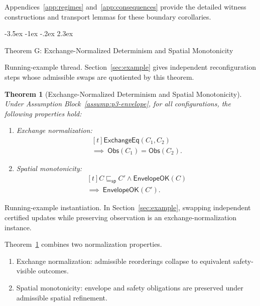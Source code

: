 \documentclass[a4paper,10pt,twocolumn,english]{article}
\makeatletter
\renewcommand{\section}{\@startsection{section}{1}{\z@}%
  {-3.5ex \@plus -1ex \@minus -.2ex}%
  {2.3ex}%
  {\raggedright\normalfont\large\bfseries}}
\numberwithin{equation}{section}
\theoremstyle{paperdef}
\theoremstyle{paperplain}
\newtheorem{theorem}[definition]{Theorem}
\theoremstyle{paperdef}
\theoremstyle{paperremark}
\theoremstyle{paperdef}
\newcommand{\EnvelopeOK}{\ensuremath{\mathsf{EnvelopeOK}}}
\newcommand{\ExchangeEq}{\ensuremath{\mathsf{ExchangeEq}}}
\newcommand{\Obs}{\ensuremath{\mathsf{Obs}}}
\makeatother
\begin{document}
Appendices~\ref{app:regimes} and~\ref{app:consequences} provide the detailed witness constructions and transport lemmas for these boundary corollaries.

\section{Theorem G: Exchange-Normalized Determinism and Spatial Monotonicity}
\label{sec:theorem-g}

Running-example thread. Section~\ref{sec:example} gives independent
reconfiguration steps whose admissible swaps are quotiented by this theorem.

\begin{theorem}[Exchange-Normalized Determinism and Spatial Monotonicity]
	\label{thm:normalization}
	Under Assumption Block~\ref{assump:p3-envelope}, for all configurations, the following properties hold:
	\begin{enumerate}
		\item Exchange normalization:
		      \begin{equation}
			      \begin{aligned}[t]
				      \ExchangeEq(C_1,C_2)
				      \\
				      \implies\ \Obs(C_1) = \Obs(C_2).
			      \end{aligned}
		      \end{equation}
		\item Spatial monotonicity:
		      \begin{equation}
			      \begin{aligned}[t]
				      C \sqsubseteq_{\mathsf{sp}} C' \land \EnvelopeOK(C)
				      \\
				      \implies\ \EnvelopeOK(C').
			      \end{aligned}
		      \end{equation}
	\end{enumerate}
\end{theorem}

Running-example instantiation. In Section~\ref{sec:example}, swapping
independent certified updates while preserving observation is an
exchange-normalization instance.

Theorem~\ref{thm:normalization} combines two normalization properties.
\begin{enumerate}
	\item Exchange normalization: admissible reorderings collapse to equivalent safety-visible outcomes.
	\item Spatial monotonicity: envelope and safety obligations are preserved under admissible spatial refinement.
\end{enumerate}
\end{document}
